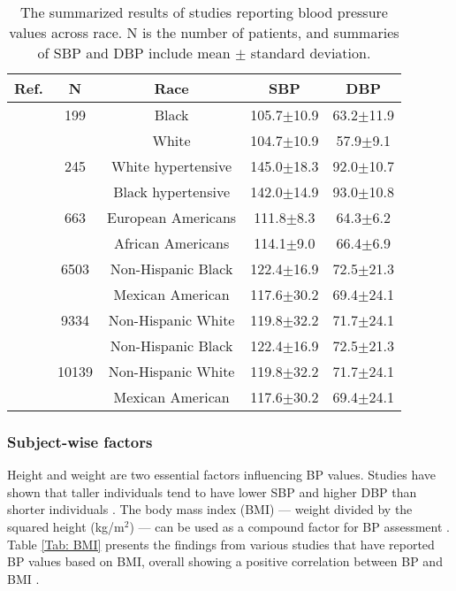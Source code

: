 \documentclass[journal,article,moreauthors]{Definitions/mdpi}
\begin{document}
\begin{table}
\caption{The summarized results of studies reporting blood pressure values across race. N is the number of patients, and summaries of SBP and DBP include mean $\pm$ standard deviation.}\label{Tab: Race}

\begin{center}
\begin{tabular}{rcccc}
\toprule
\textbf{Ref.} & \textbf{N}   &\textbf{Race} & \textbf{SBP} & \textbf{DBP} \\
\hline
\citep{harshfield1989race} & 199 & Black & 105.7$\pm$10.9 & 63.2$\pm$11.9 \\
 &  & White & 104.7$\pm$10.9 & 57.9$\pm$9.1 \\
\hline
\citep{mayet1998ethnic} & 245 & White hypertensive & 145.0$\pm$18.3 & 92.0$\pm$10.7 \\
 &  & Black hypertensive & 142.0$\pm$14.9 & 93.0$\pm$10.8
 \\
\hline
\citep{Wang2006-jk} & 663 & European Americans & 111.8$\pm$8.3 & 64.3$\pm$6.2 \\
 &  & African Americans & 114.1$\pm$9.0 & 66.4$\pm$6.9 \\
\hline
\citep{bourgeois2017associations} & 6503 & Non-Hispanic Black & 122.4$\pm$16.9 & 72.5$\pm$21.3 \\
 &  & Mexican American & 117.6$\pm$30.2 & 69.4$\pm$24.1 \\
\hline
\citep{bourgeois2017associations} & 9334 & Non-Hispanic White & 119.8$\pm$32.2 & 71.7$\pm$24.1 \\
 &  & Non-Hispanic Black & 122.4$\pm$16.9 & 72.5$\pm$21.3 \\\hline
\citep{bourgeois2017associations} & 10139 & Non-Hispanic White & 119.8$\pm$32.2 & 71.7$\pm$24.1 \\
 &  & Mexican American & 117.6$\pm$30.2 & 69.4$\pm$24.1 \\
 \bottomrule
\end{tabular}
\end{center}
\end{table}


\subsubsection{Subject-wise factors}
Height and weight are two essential factors influencing BP values. Studies have shown that taller individuals tend to have lower SBP and higher DBP than shorter individuals \citep{bourgeois2017associations}. The body mass index (BMI) --- weight divided by the squared height (kg/m$^2$) --- can be used as a compound factor for BP assessment \citep{he2000blood, jena2018relationship}. Table \ref{Tab: BMI} presents the findings from various studies that have reported BP values based on BMI, overall showing a positive correlation between BP and BMI \citep{neter2003influence, Neter2003}.
\end{document}
